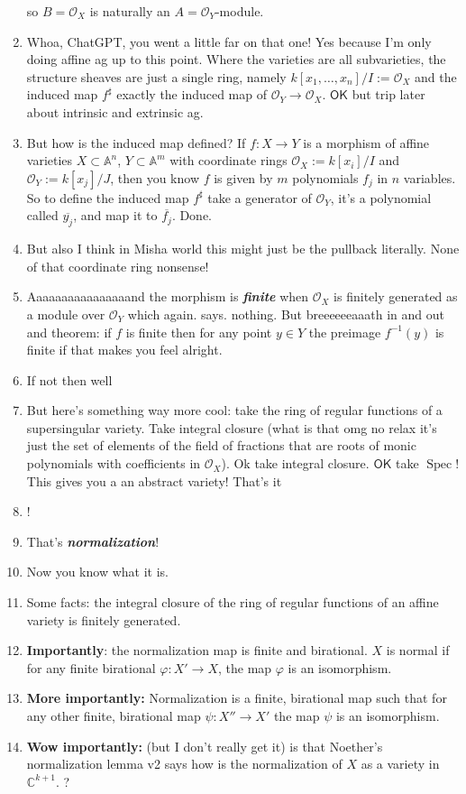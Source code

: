 \begin{enumerate}
so \( B = \mathcal{O}_X \) is naturally an \( A = \mathcal{O}_Y \)-module.
\item Whoa, ChatGPT, you went a little far on that one! Yes because I'm only doing affine ag up to this point. Where the varieties are all subvarieties, the structure sheaves are just a single ring, namely \(k[x_1,\ldots,x_n]/I:=\mathcal{O}_X\) and the induced map \(f^\sharp\) exactly the induced map of \(\mathcal{O}_Y \to \mathcal{O}_X\). \(\mathsf{OK}\) but trip later about intrinsic and extrinsic ag.
\item But how is the induced map defined? If \(f:X \to Y\) is a morphism of affine varieties \(X \subset \mathbb{A}^n\), \(Y\subset \mathbb{A}^m\) with coordinate rings \(\mathcal{O}_X:=k[x_i]/I\) and \(\mathcal{O}_Y:=k[x_j]/J\), then you know \(f\) is given by \(m\) polynomials \(f_j\) in \(n\) variables. So to define the induced map \(f^\sharp\) take a generator of \(\mathcal{O}_Y\), it's a polynomial called \(\overline{y_j}\), and map it to \(\overline{f_j}\). Done.
\item But also I think in Misha world this might just be the pullback literally. None of that coordinate ring nonsense!
\item Aaaaaaaaaaaaaaaand the morphism is \textit{\textbf{finite}} when \(\mathcal{O}_X\) is finitely generated as a module over \(\mathcal{O}_Y\) which again. says. nothing. But breeeeeeaaath in and out and theorem: if \(f\) is finite then for any point \(y \in Y\) the preimage \(f^{-1}(y)\) is finite if that makes you feel alright.
\item If not then well 
\item But here's something way more cool: take the ring of regular functions of a supersingular variety. Take integral closure (what is that omg no relax it's just the set of elements of the field of fractions that are roots of monic polynomials with coefficients in  \(\mathcal{O}_X\)). Ok take integral closure. \(\mathsf{OK}\) take \(\operatorname{Spec}\)! This gives you a an abstract variety! That's it
\item !
\item That's \textit{\textbf{normalization}}!
\item Now you know what it is.
\item Some facts: the integral closure of the ring of regular functions of an affine variety is finitely generated.
\item \textbf{Importantly}: the normalization map is finite and birational. \(X\) is normal if for any finite birational \(\varphi:X' \to X\), the map \(\varphi\) is an isomorphism.
\item \textbf{More importantly:} Normalization is a finite, birational map such that for any other finite, birational map \(\psi:X'' \to X'\) the map \(\psi\) is an isomorphism.
\item \textbf{Wow importantly:} (but I don't really get it) is that Noether's normalization lemma v2 says how is the normalization of \(X\) as a variety in \(\mathbb{C}^{k+1}\). ?
\end{enumerate}

